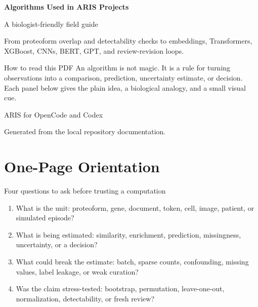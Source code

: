\documentclass[10pt]{article}
\begin{document}
\begin{titlepage}
\pagecolor{arisMist}
\color{arisInk}
\vspace*{0.7in}
{\Huge \bfseries Algorithms Used in ARIS Projects\par}
\vspace{0.18in}
{\Large A biologist-friendly field guide\par}
\vspace{0.35in}
{\large From proteoform overlap and detectability checks to embeddings, Transformers, XGBoost, CNNs, BERT, GPT, and review-revision loops.\par}
\vfill
\begin{takehomebox}{How to read this PDF}
An algorithm is not magic. It is a rule for turning observations into a comparison, prediction, uncertainty estimate, or decision. Each panel below gives the plain idea, a biological analogy, and a small visual cue.
\end{takehomebox}
\vspace{0.3in}
{\large ARIS for OpenCode and Codex\par}
{\small Generated from the local repository documentation.\par}
\end{titlepage}
\nopagecolor

\tableofcontents
\newpage

\section{One-Page Orientation}

\begin{takehomebox}{Four questions to ask before trusting a computation}
\begin{enumerate}
  \item What is the unit: proteoform, gene, document, token, cell, image, patient, or simulated episode?
  \item What is being estimated: similarity, enrichment, prediction, missingness, uncertainty, or a decision?
  \item What could break the estimate: batch, sparse counts, confounding, missing values, label leakage, or weak curation?
  \item Was the claim stress-tested: bootstrap, permutation, leave-one-out, normalization, detectability, or fresh review?
\end{enumerate}
\end{takehomebox}
\end{document}
